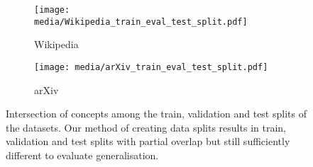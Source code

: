 \begin{figure}
    \centering
    \begin{subfigure}[t]{0.36\linewidth}
        \centering
        \texttt{[image: media/Wikipedia\_train\_eval\_test\_split.pdf]}
        \caption{Wikipedia}
    \end{subfigure}%
    \qquad\qquad
    \begin{subfigure}[t]{0.30\linewidth}
        \centering
        \texttt{[image: media/arXiv\_train\_eval\_test\_split.pdf]}
        \caption{arXiv}
    \end{subfigure}
    \caption{Intersection of concepts among the train, validation and test splits of the datasets. Our method of creating data splits results in train, validation and test splits with partial overlap but still sufficiently different to evaluate generalisation.}
    \label{fig:dataset-overlap}
\end{figure}
